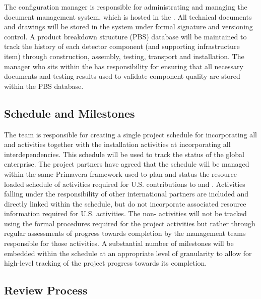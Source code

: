 The configuration manager is responsible for administrating
and managing the  document management system, 
which is hosted in the .  All technical documents 
and drawings will be stored in the  system under 
formal signature and versioning control.  A product breakdown 
structure (PBS) database will be maintained to track the history 
of each detector component (and supporting infrastructure item) 
through construction, assembly, testing, transport and installation.  
The   manager who sits within the 
 has responsibility for ensuring that all necessary 
documents and testing results used to validate component quality 
are stored within the PBS database.

\subsection{Schedule and Milestones}
\label{sec:dune_schedule}

The  team is responsible for creating a single 
project schedule for  incorporating all 
 and  activities together with the 
 installation activities at  
incorporating all interdependencies.  This schedule will 
be used to track the status of the global enterprise.  The 
project partners have agreed that the  
schedule will be managed within the same Primavera  framework 
used to plan and status the resource-loaded schedule of 
activities required for U.S.  contributions to 
 and .  Activities falling under the 
responsibility of other international partners are included 
and directly linked within the  schedule, but do 
not incorporate associated resource information required for 
U.S.  activities.  The non- activities 
will not be tracked using the formal  procedures 
required for the  project activities but rather 
through regular assessments of progress towards completion 
by the management teams responsible for those activities.  
A substantial number of milestones will be embedded within 
the schedule at an appropriate level of granularity to allow 
for high-level tracking of the project progress towards its 
completion.

\subsection{Review Process}
\label{sec:dune_review}

